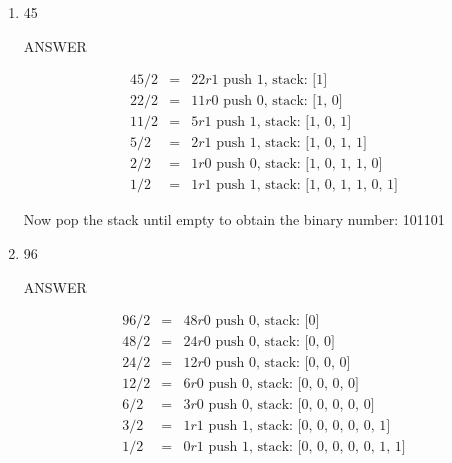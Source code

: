 \documentclass{article} %
\begin{document}
\begin{enumerate}
\begin{enumerate}
    
    \item
        45
      
        \begin{minipage}{4.5in}
          \vspace{.1in}

          ANSWER

          \begin{eqnarray*}
            45 / 2 &=& 22 r 1 \text{ push 1, stack: [1]} \\
            22 / 2  &=& 11 r 0 \text{ push 0, stack: [1, 0]} \\
            11 / 2  &=& 5 r 1 \text{ push 1, stack: [1, 0, 1]} \\
            5 / 2  &=& 2 r 1 \text{ push 1, stack: [1, 0, 1, 1]} \\
            2 / 2  &=& 1 r 0 \text{ push 0, stack: [1, 0, 1, 1, 0]} \\
            1 / 2  &=& 1 r 1 \text{ push 1, stack: [1, 0, 1, 1, 0, 1]} 
          \end{eqnarray*}

          Now pop the stack until empty to obtain the binary number: 101101

          \vspace{.1in}
        \end{minipage}

    \item
        96
      
        \begin{minipage}{4.5in}
          \vspace{.3in}

          ANSWER
          
          \begin{eqnarray*}
            96 / 2 &=& 48 r 0 \text{ push 0, stack: [0]} \\
            48 / 2 &=& 24 r 0 \text{ push 0, stack: [0, 0]} \\
            24 / 2 &=& 12 r 0 \text{ push 0, stack: [0, 0, 0]} \\
            12 / 2 &=& 6 r 0  \text{ push 0, stack: [0, 0, 0, 0]} \\
            6 / 2 &=& 3 r 0   \text{ push 0, stack: [0, 0, 0, 0, 0]} \\
            3 / 2 &=& 1 r 1   \text{ push 1, stack: [0, 0, 0, 0, 0, 1]} \\
            1 / 2 &=& 0 r 1   \text{ push 1, stack: [0, 0, 0, 0, 0, 1, 1]}
          \end{eqnarray*}


\end{minipage}
\end{enumerate}
\end{enumerate}
\end{document}
